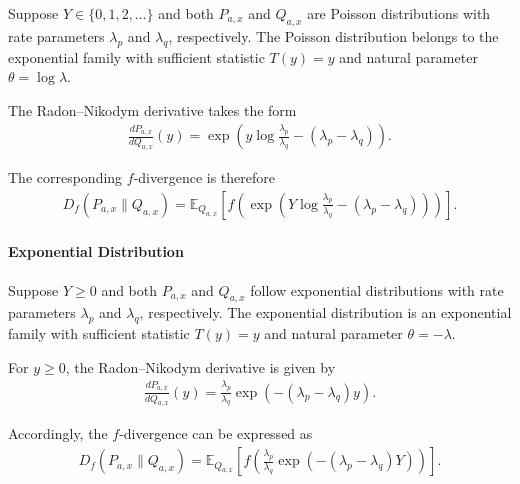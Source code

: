 Suppose $Y\in\{0,1,2,\dots\}$ and both $P_{a,x}$ and $Q_{a,x}$ are Poisson distributions with rate parameters $\lambda_p$ and $\lambda_q$, respectively.
The Poisson distribution belongs to the exponential family with sufficient statistic $T(y)=y$ and natural parameter $\theta=\log\lambda$.

The Radon--Nikodym derivative takes the form
\begin{align}
    \frac{dP_{a,x}}{dQ_{a,x}}(y) = \exp\left( y\log\frac{\lambda_p}{\lambda_q} - (\lambda_p-\lambda_q) \right).
\end{align}

The corresponding $f$-divergence is therefore
\begin{align}
    D_f(P_{a,x}\|Q_{a,x}) = \mathbb{E}_{Q_{a,x}}\left[ f\left( \exp\left( Y\log\frac{\lambda_p}{\lambda_q} - (\lambda_p-\lambda_q) \right) \right) \right].
\end{align}

\paragraph{Exponential Distribution}

Suppose $Y\ge0$ and both $P_{a,x}$ and $Q_{a,x}$ follow exponential distributions with rate parameters $\lambda_p$ and $\lambda_q$, respectively.
The exponential distribution is an exponential family with sufficient statistic $T(y)=y$ and natural parameter $\theta=-\lambda$.

For $y\ge0$, the Radon--Nikodym derivative is given by
\begin{align}
    \frac{dP_{a,x}}{dQ_{a,x}}(y) = \frac{\lambda_p}{\lambda_q} \exp\left( -(\lambda_p-\lambda_q)y \right).
\end{align}

Accordingly, the $f$-divergence can be expressed as
\begin{align}
    D_f(P_{a,x}\|Q_{a,x}) = \mathbb{E}_{Q_{a,x}}\left[ f\left( \frac{\lambda_p}{\lambda_q} \exp\left( -(\lambda_p-\lambda_q)Y \right) \right) \right].
\end{align}



